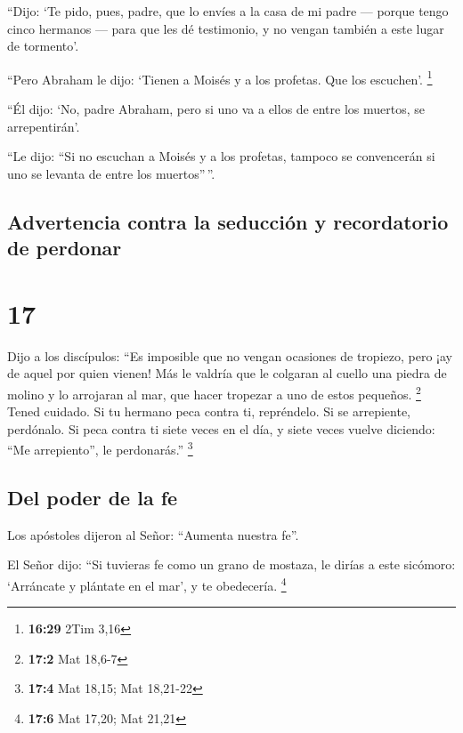  ``Dijo: `Te pido, pues, padre, que lo envíes a la casa
de mi padre ---  porque tengo cinco hermanos --- para que
les dé testimonio, y no vengan también a este lugar de tormento'.

 ``Pero Abraham le dijo: `Tienen a Moisés y a los
profetas. Que los escuchen'. \footnote{\textbf{16:29} 2Tim 3,16}

 ``Él dijo: `No, padre Abraham, pero si uno va a ellos de
entre los muertos, se arrepentirán'.

 ``Le dijo: ``Si no escuchan a Moisés y a los profetas,
tampoco se convencerán si uno se levanta de entre los muertos''\,''.

\hypertarget{advertencia-contra-la-seducciuxf3n-y-recordatorio-de-perdonar}{%
\subsection{Advertencia contra la seducción y recordatorio de
perdonar}\label{advertencia-contra-la-seducciuxf3n-y-recordatorio-de-perdonar}}

\hypertarget{section-16}{%
\section{17}\label{section-16}}

 Dijo a los discípulos: ``Es imposible que no vengan
ocasiones de tropiezo, pero ¡ay de aquel por quien vienen!
 Más le valdría que le colgaran al cuello una piedra de
molino y lo arrojaran al mar, que hacer tropezar a uno de estos
pequeños. \footnote{\textbf{17:2} Mat 18,6-7}  Tened
cuidado. Si tu hermano peca contra ti, repréndelo. Si se arrepiente,
perdónalo.  Si peca contra ti siete veces en el día, y
siete veces vuelve diciendo: ``Me arrepiento'', le perdonarás.''
\footnote{\textbf{17:4} Mat 18,15; Mat 18,21-22}

\hypertarget{del-poder-de-la-fe}{%
\subsection{Del poder de la fe}\label{del-poder-de-la-fe}}

 Los apóstoles dijeron al Señor: ``Aumenta nuestra fe''.

 El Señor dijo: ``Si tuvieras fe como un grano de mostaza,
le dirías a este sicómoro: `Arráncate y plántate en el mar', y te
obedecería. \footnote{\textbf{17:6} Mat 17,20; Mat 21,21}

